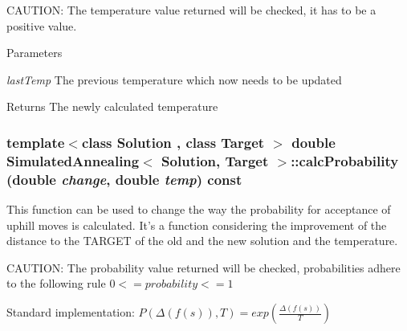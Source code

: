 CAUTION: The temperature value returned will be checked, it has to be a positive value. 
\begin{DoxyParams}{Parameters}
\item[{\em lastTemp}]The previous temperature which now needs to be updated \end{DoxyParams}
\begin{DoxyReturn}{Returns}
The newly calculated temperature 
\end{DoxyReturn}
\hypertarget{class_simulated_annealing_ab452f2d789d884d549ea60515a3a9c2f}{
\subsubsection[{calcProbability}]{\setlength{\rightskip}{0pt plus 5cm}template$<$class Solution , class Target $>$ double {\bf SimulatedAnnealing}$<$ Solution, Target $>$::calcProbability (double {\em change}, \/  double {\em temp}) const}}
\label{class_simulated_annealing_ab452f2d789d884d549ea60515a3a9c2f}
This function can be used to change the way the probability for acceptance of uphill moves is calculated. It's a function considering the improvement of the distance to the TARGET of the old and the new solution and the temperature.

CAUTION: The probability value returned will be checked, probabilities adhere to the following rule $ 0<=probability<=1 $

Standard implementation: $ P(\Delta(f(s)), T) = exp(\frac{\Delta(f(s))}{T}) $


